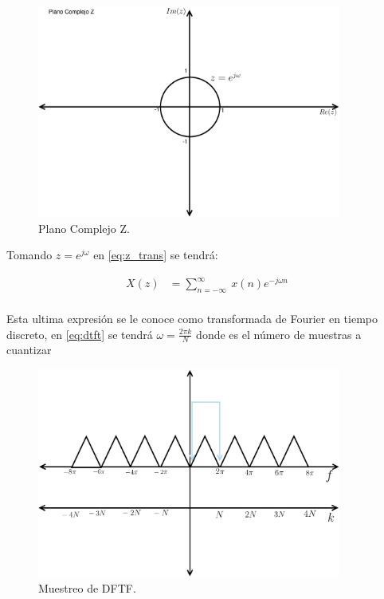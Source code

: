 \documentclass[12pt]{article}
\begin{document}
\begin{figure}[h]
    \centering
        \includegraphics[width=10cm]{IMAGENES/zplane.eps}
        \caption{Plano Complejo Z.}
\end{figure}

Tomando $z=e^{j\omega}$ en \ref{eq:z_trans} se tendrá:

\begin{equation}
    \begin{split}
        X(z)&=\displaystyle\sum_{n=-\infty}^{\infty}\ x(n)e^{-j\omega n}\\    
    \end{split}
    \label{eq:dtft}
\end{equation}

Esta ultima expresión se le conoce como transformada de Fourier en tiempo discreto, en \ref{eq:dtft} se tendrá $\omega=\frac{2\pi k}{N}$ donde es el número de muestras a cuantizar 
\vspace{30mm}
\begin{figure}[h]
    \centering
        \includegraphics[width=10cm]{IMAGENES/dtft.eps}
        \caption{Muestreo de DFTF.}
\end{figure}
\end{document}
